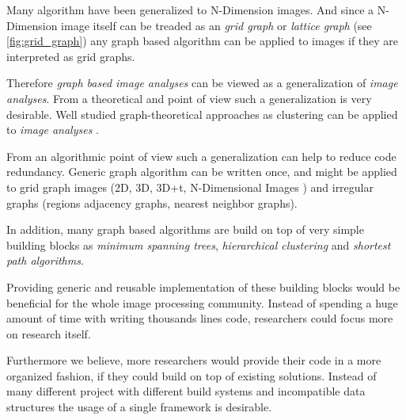 
Many algorithm have been generalized to N-Dimension images.
And since a N-Dimension image itself can be treaded as an \emph{grid graph} or \emph{lattice graph} (see \cref{fig:grid_graph}) any graph based algorithm can be applied to images if they are interpreted as grid graphs.

Therefore \emph{graph based image analyses} can be viewed as a generalization of \emph{image analyses}.
From a theoretical and  point of view such a generalization is very desirable.
Well studied graph-theoretical approaches as clustering can be applied 
to  \emph{image analyses} \cite{vlachos_1993_csv,arbelaez_2006_cvpr,ohlander_1978_cgip}.

From an algorithmic point of view such a generalization can help to reduce 
code redundancy.
Generic graph algorithm can be written once, and might be applied 
to grid graph images (2D, 3D, 3D+t, N-Dimensional Images ) and irregular graphs (regions adjacency graphs, nearest neighbor graphs).

In addition, many graph based algorithms are build on top of
very simple building blocks 
as \emph{minimum spanning trees}, \emph{hierarchical clustering} and 
\emph{shortest path algorithms}. 

Providing generic and reusable implementation of these building blocks
would be beneficial for the whole image processing community.
Instead of spending a huge amount of time with writing thousands lines code,
researchers could focus more on research itself.

Furthermore we believe, more researchers would provide their code in a more organized fashion, if 
they could build on top of existing solutions.
Instead of many different project with different build systems and incompatible data structures
the usage of a single framework is desirable.







